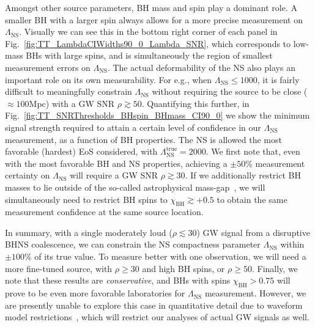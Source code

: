 \documentclass[aps,prd,amsmath,floats,floatfix, twocolumn,
superscriptaddress,nofootinbib,showpacs]{revtex4-1}
\newcommand{\lambdans}{\Lambda_\mathrm{NS}}
\newcommand{\chibh}{\chi_\mathrm{BH}}
\begin{document}
Amongst other source parameters, BH mass and spin play a dominant role. A smaller
BH with a larger spin always allows for a more precise measurement on $\lambdans$.
Visually we can see this in the bottom right corner of each panel in
Fig.~\ref{fig:TT_LambdaCIWidths90_0_Lambda_SNR}, which corresponds to low-mass BHs
with large spins, and is simultaneously the region of smallest measurement errors on $\lambdans$.
The actual deformability of the NS also plays an important role on its own
measurability. For e.g., when $\lambdans\leq 1000$, it is fairly difficult
to meaningfully constrain $\lambdans$ without requiring the source to be
close ($\approx 100$Mpc) with a GW SNR $\rho\gtrsim 50$. Quantifying this further,
in Fig.~\ref{fig:TT_SNRThresholds_BHspin_BHmass_CI90_0} we show the minimum
signal strength required to attain a certain level of confidence in our
$\lambdans$ measurement, as a function of BH properties. The NS is allowed
the most favorable (hardest) EoS considered, with $\lambdans^\mathrm{true}=2000$.
% 
We first note that, even with the most favorable BH and NS properties, achieving
a $\pm 50\%$ measurement certainty on $\lambdans$ will require a GW SNR
$\rho\gtrsim 30$. If we additionally restrict BH masses to lie outside of the so-called
astrophysical mass-gap~\cite{Bailyn:1997xt,Kalogera:1996ci,Kreidberg:2012,
Littenberg:2015tpa}, we will simultaneously need to restrict BH spins
to $\chibh\gtrsim +0.5$ to obtain the same measurement confidence at the same
source location.



In summary, with a single moderately loud ($\rho\lesssim 30$) GW signal from
a disruptive BHNS coalescence, we can constrain
the NS compactness parameter $\lambdans$ within $\pm 100\%$ of its true value.
To measure better with one observation, we will need a more fine-tuned source, with
$\rho\geq 30$ and high BH spins, or $\rho\geq 50$.
% 
Finally, we note that these results are {\it conservative}, and 
BHs with spins $\chibh > 0.75$ will prove to be even more favorable laboratories
for $\lambdans$ measurement. However, we are presently unable to explore this case
in quantitative detail due to waveform model restrictions~\cite{Lackey:2013axa},
which will restrict our analyses of actual GW signals as well.



\end{document}
